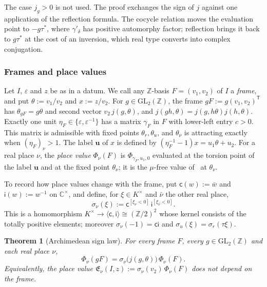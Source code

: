\documentclass[11pt]{amsart}
\numberwithin{equation}{section}
\theoremstyle{plain}
\newtheorem{theorem}{Theorem}[section]
\theoremstyle{definition}
\theoremstyle{remark}
\begin{document}
The case \(j_g>0\) is not used. The proof exchanges the sign of \(j\) against one application of the reflection formula. The cocycle relation moves the evaluation point to \(-g\tau^*\), where \(\gamma'_\delta\) has positive automorphy factor; reflection brings it back to \(g\tau^*\) at the cost of an inversion, which real type converts into complex conjugation.

\subsubsection*{Frames and place values}
Let \(I\), \(\varepsilon\) and \(z\) be as in a datum. We call any \(\mathbb Z\)-basis \(F=(v_1,v_2)\) of \(I\) a \emph{frame}, and put \(\theta:=v_1/v_2\) and \(x:=z/v_2\). For \(g\in\mathrm{GL}_2(\mathbb Z)\), the frame \(gF:=g(v_1,v_2)^{\mathsf T}\) has \(\theta_{gF}=g\theta\) and second vector \(v_2\,j(g,\theta)\), and \(j(gh,\theta)=j(g,h\theta)j(h,\theta)\). Exactly one unit \(\eta_F\in\{\varepsilon,\varepsilon^{-1}\}\) has a matrix \(\gamma_F\) in \(F\) with lower-left entry \(c>0\). This matrix is admissible with fixed points \(\theta_r,\theta_u\), and \(\theta_\nu\) is attracting exactly when \((\eta_F)_\nu>1\). The label \(\mathbf u\) of \(x\) is defined by \((\eta_F^{-1}-1)x=u_1\theta+u_2\). For a real place \(\nu\), the \emph{place value} \(\Phi_\nu(F)\) is \(\Phi_{\gamma_F,u_1,0}\) evaluated at the torsion point of the label \(\mathbf u\) and at the fixed point \(\theta_\nu\); it is the \(\mu\)-free value of~\cite{RW} at \(\theta_\nu\).

To record how place values change with the frame, put \(\mathsf c(w):=\bar w\) and \(\mathsf i(w):=w^{-1}\) on \(\mathbb C^\times\), and define, for \(\xi\in K^\times\) and \(\bar\nu\) the other real place,
\[\sigma_\nu(\xi):=\mathsf c^{[\xi_\nu<0]}\,\mathsf i^{[\xi_{\bar\nu}<0]}.\]
This is a homomorphism \(K^\times\to\langle\mathsf c,\mathsf i\rangle\cong(\mathbb Z/2)^2\) whose kernel consists of the totally positive elements; moreover \(\sigma_\nu(-1)=\mathsf c\mathsf i\) and \(\sigma_u(\xi)=\sigma_r(\tau\xi)\).

\begin{theorem}[Archimedean sign law]\label{thm:sign}
For every frame \(F\), every \(g\in\mathrm{GL}_2(\mathbb Z)\) and each real place \(\nu\),
\[\Phi_\nu(gF)=\sigma_\nu\bigl(j(g,\theta)\bigr)\,\Phi_\nu(F).\]
Equivalently, the place value \(\mathfrak E_\nu(I,z):=\sigma_\nu(v_2)\,\Phi_\nu(F)\) does not depend on the frame.
\end{theorem}
\end{document}
